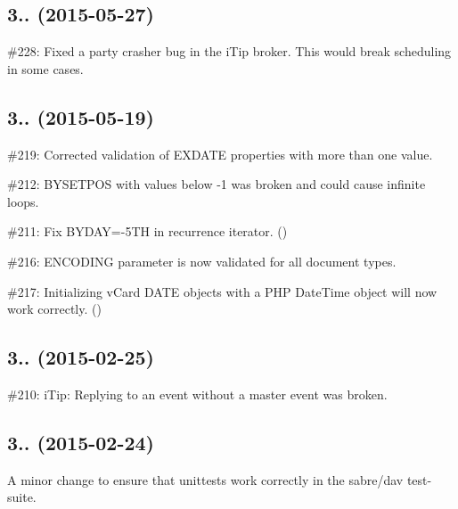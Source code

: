 \subsection*{3.. (2015-\/05-\/27) }


\begin{DoxyItemize}
\item \#228\+: Fixed a \textquotesingle{}party crasher\textquotesingle{} bug in the i\+Tip broker. This would break scheduling in some cases.
\end{DoxyItemize}

\subsection*{3.. (2015-\/05-\/19) }


\begin{DoxyItemize}
\item \#219\+: Corrected validation of {\ttfamily E\+X\+D\+A\+TE} properties with more than one value.
\item \#212\+: {\ttfamily B\+Y\+S\+E\+T\+P\+OS} with values below {\ttfamily -\/1} was broken and could cause infinite loops.
\item \#211\+: Fix {\ttfamily B\+Y\+D\+AY=-\/5\+TH} in recurrence iterator. ()
\item \#216\+: {\ttfamily E\+N\+C\+O\+D\+I\+NG} parameter is now validated for all document types.
\item \#217\+: Initializing v\+Card {\ttfamily D\+A\+TE} objects with a P\+HP Date\+Time object will now work correctly. ()
\end{DoxyItemize}

\subsection*{3.. (2015-\/02-\/25) }


\begin{DoxyItemize}
\item \#210\+: i\+Tip\+: Replying to an event without a master event was broken.
\end{DoxyItemize}

\subsection*{3.. (2015-\/02-\/24) }


\begin{DoxyItemize}
\item A minor change to ensure that unittests work correctly in the sabre/dav test-\/suite.
\end{DoxyItemize}

